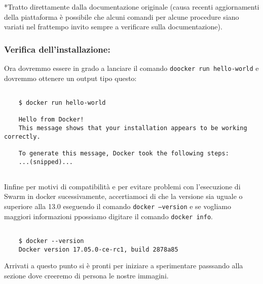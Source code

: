 *Tratto direttamente dalla documentazione originale (causa recenti aggiornamenti della piattaforma è possibile che alcuni comandi per alcune procedure siano variati nel frattempo invito sempre a verificare sulla documentazione).
\subsubsection{Verifica dell'installazione:}Ora dovremmo essere in grado a lanciare il comando \texttt{doocker run hello-world} e dovremmo ottenere un output tipo questo:
\begin{verbatim}

	$ docker run hello-world
	
	Hello from Docker!
	This message shows that your installation appears to be working correctly.
	
	To generate this message, Docker took the following steps:
	...(snipped)...
	
\end{verbatim}
Iinfine per motivi di compatibilità e per evitare problemi con l'esecuzione di Swarm in docker sucessivamente, accertiamoci di che la versione sia uguale o superiore alla 13.0 eseguendo  il comando \texttt{docker --version} e se vogliamo maggiori informazioni ppossiamo digitare il comando \texttt{docker info}.
\begin{verbatim}

	$ docker --version
	Docker version 17.05.0-ce-rc1, build 2878a85

\end{verbatim}
Arrivati a questo punto si è pronti per iniziare a sperimentare passsando alla sezione dove creeremo di persona le nostre immagini.

